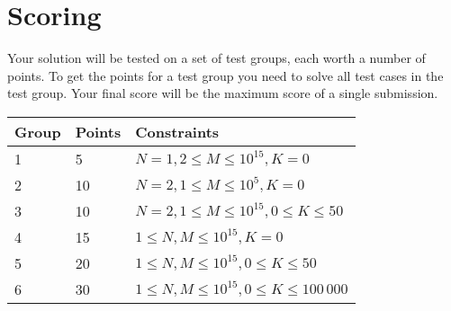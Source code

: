 \section*{Scoring}
Your solution will be tested on a set of test groups, each worth a number of points.
To get the points for a test group you need to solve all test cases in the test group.
Your final score will be the maximum score of a single submission.

\noindent
\begin{tabular}{| l | l | l |}
\hline
Group & Points & Constraints \\ \hline
1     & 5      & $N = 1, 2 \le M \le 10^{15}, K = 0$ \\ \hline
2     & 10     & $N = 2, 1 \le M \le 10^5, K = 0$ \\ \hline
3     & 10     & $N = 2, 1 \le M \le 10^{15}, 0 \le K \le 50$ \\ \hline
4     & 15     & $1 \le N, M \le 10^{15}, K = 0$ \\ \hline
5     & 20     & $1 \le N, M \le 10^{15}, 0 \le K \le 50$ \\ \hline
6     & 30     & $1 \le N, M \le 10^{15}, 0 \le K \le 100\,000$ \\ \hline
\end{tabular}
